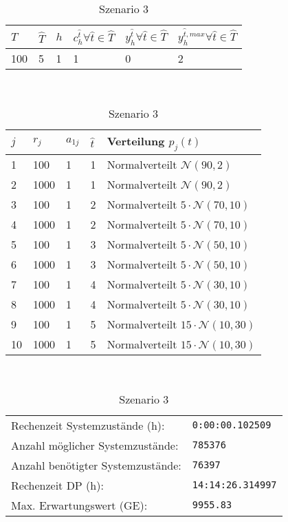 \begin{table}[h!]
\renewcommand{\arraystretch}{1.5}
  \begin{center}
    \caption{Szenario 3}  \label{S3}
    \vspace*{3mm}
    \begin{tabular}{l l l l l l}   %
    $T$ & $\hat T$  & $h$ & $c_h^{\hat t}\forall \hat{t}\in{\hat T}$ & $y_h^{\hat t}\forall \hat{t}\in{\hat T}$  & $y_h^{{\hat t},max}\forall \hat{t}\in{\hat T}$  \\  \hline
100 & 5 & 1 & 1 & 0 & 2  \\ \hline
    \end{tabular} \\[3mm]
        \begin{tabular}{p{1cm} p{1cm} p{1cm}  p{1cm} p{6cm}}   %
    $j$ & $r_j$  & $a_{1j}$ & $\hat t$ & Verteilung $p_j(t)$ \\  \hline
1 & 100 & 1 & 1 & Normalverteilt $\mathcal{N}(90, 2)$   \\
2 & 1000 & 1 & 1 & Normalverteilt $\mathcal{N}(90, 2)$  \\
3 & 100 & 1 & 2 & Normalverteilt $5\cdot\mathcal{N}(70, 10)$  \\
4 & 1000 & 1 & 2 & Normalverteilt $5\cdot\mathcal{N}(70, 10)$  \\
5 & 100 & 1 & 3 & Normalverteilt $5\cdot\mathcal{N}(50, 10)$ \\
6 & 1000 & 1 & 3 & Normalverteilt $5\cdot\mathcal{N}(50, 10)$ \\
7 & 100 & 1 & 4 & Normalverteilt $5\cdot\mathcal{N}(30, 10)$  \\
8 & 1000 & 1 & 4 & Normalverteilt $5\cdot\mathcal{N}(30, 10)$  \\
9 & 100 & 1 & 5 & Normalverteilt $15\cdot\mathcal{N}(10, 30)$  \\
10 & 1000 & 1 & 5 & Normalverteilt $15\cdot\mathcal{N}(10, 30)$  \\ \hline
    \end{tabular} \\[3mm]
     \begin{tabular}{p{7cm}p{5cm}} \hline
     Rechenzeit Systemzustände (h): & \texttt{0:00:00.102509} \\
     Anzahl möglicher Systemzustände: & \texttt{785376} \\
     Anzahl benötigter Systemzustände: & \texttt{76397} \\ 
     Rechenzeit DP (h): & \texttt{14:14:26.314997} \\ 
          Max. Erwartungswert (GE): & \texttt{9955.83} \\ \hline
         \end{tabular} \\[3mm]
  \end{center}
\end{table}

